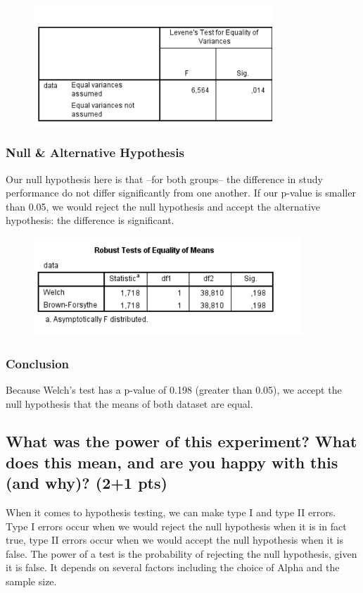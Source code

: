 \documentclass[14]{article}
\begin{document}
\begin{figure}[!htb]
	\includegraphics[width=0.8\textwidth]{img/question3/Levene.PNG}
	\captionsetup{width=1.0\textwidth}
	\centering 
\end{figure}

\subsubsection{Null \& Alternative Hypothesis}%
Our null hypothesis here is that --for both groups-- the difference in study performance do not differ significantly from one another. If our p-value is smaller than 0.05, we would reject the null hypothesis and accept the alternative hypothesis: the difference is significant.

\begin{figure}[!htb]
	\includegraphics[width=0.9\textwidth]{img/question3/Welch.PNG}
	\captionsetup{width=1.0\textwidth}
	\centering 
\end{figure}

\subsubsection{Conclusion}
Because Welch's test has a p-value of 0.198 (greater than 0.05), we accept the null hypothesis that the means of both dataset are equal. 

\subsection{What was the power of this experiment? What does this mean, and are you happy with this (and why)? (2+1 pts)}
When it comes to hypothesis testing, we can make type I and type II errors. Type I errors occur when we would reject the null hypothesis when it is in fact true, type II errors occur when we would accept the null hypothesis when it is false.
The power of a test is the probability of rejecting the null hypothesis, given it is false. It depends on several factors including the choice of Alpha and the sample size.
\end{document}
